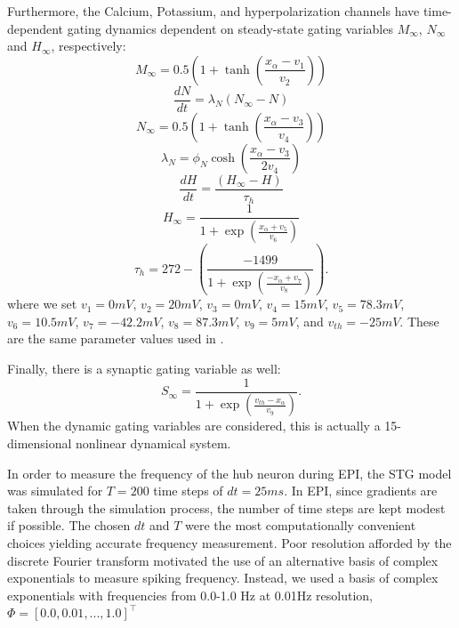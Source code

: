 \documentclass[11pt]{article}
\begin{document}
Furthermore, the Calcium, Potassium, and hyperpolarization channels have time-dependent gating dynamics dependent on steady-state gating variables $M_\infty$, $N_\infty$ and $H_\infty$, respectively:
\begin{equation}  M_{\infty} = 0.5 \left( 1 + \tanh \left( \frac{x_\alpha - v_1}{v_2} \right) \right) \end{equation}
\begin{equation}  \frac{dN}{dt} = \lambda_N (N_\infty - N)  \end{equation}
\begin{equation}  N_\infty = 0.5 \left( 1 + \tanh \left( \frac{x_\alpha - v_3}{v_4} \right) \right) \end{equation}
\begin{equation}  \lambda_N = \phi_N \cosh \left( \frac{x_\alpha - v_3}{2 v_4} \right) \end{equation}
\begin{equation}  \frac{dH}{dt} = \frac{\left( H_\infty - H \right)}{\tau_h} \end{equation}
\begin{equation}  H_\infty = \frac{1}{1 + \exp \left( \frac{x_\alpha + v_5}{v_6} \right)} \end{equation}
\begin{equation}  \tau_h = 272 - \left( \frac{-1499}{1 + \exp \left( \frac{-x_\alpha + v_7}{v_8} \right)} \right).
 \end{equation}
where we set $v_1 = 0mV$, $v_2  = 20mV$, $v_3 = 0mV$, $v_4 = 15mV$, $v_5 = 78.3mV$,
$v_6 = 10.5mV$, $v_7 = -42.2mV$, $v_8 = 87.3mV$, $v_9 = 5mV$, and $v_{th} = -25mV$.  These are the same parameter values used in \cite{gutierrez2013multiple}.

Finally, there is a synaptic gating variable as well:
\begin{equation} S_\infty = \frac{1}{1 + \exp \left( \frac{v_{th} - x_\alpha}{v_9} \right)} .
\end{equation}
When the dynamic gating variables are considered, this is actually a 15-dimensional nonlinear dynamical system.

In order to measure the frequency of the hub neuron during EPI, the STG model was simulated for $T = 200$ time steps of $dt = 25ms$.  In EPI, since gradients are taken through the simulation process, the number of time steps are kept modest if possible. The chosen $dt$ and $T$ were the most computationally convenient choices yielding accurate frequency measurement.  Poor resolution afforded by the discrete Fourier transform motivated the use of an alternative basis of complex exponentials to measure spiking frequency.  Instead, we used a basis of complex exponentials with frequencies from 0.0-1.0 Hz at 0.01Hz resolution, $\Phi = \left[ 0.0, 0.01, ..., 1.0 \right]^\top$
\end{document}
